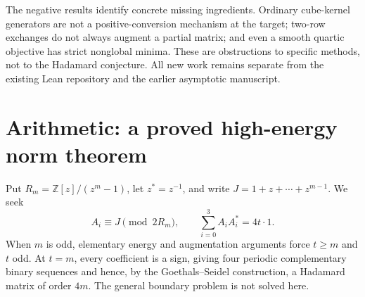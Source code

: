 \documentclass[11pt]{article}
\newcommand{\Z}{\mathbb Z}
\begin{document}
The negative results identify concrete missing ingredients. Ordinary
cube-kernel generators are not a positive-conversion mechanism at the
target; two-row exchanges do not always augment a partial matrix; and
even a smooth quartic objective has strict nonglobal minima. These are
obstructions to specific methods, not to the Hadamard conjecture.
All new work remains separate from the existing Lean repository and
the earlier asymptotic manuscript.

\section{Arithmetic: a proved high-energy norm theorem}


Put $R_m=\Z[z]/(z^m-1)$, let $z^*=z^{-1}$, and write
$J=1+z+\cdots+z^{m-1}$. We seek
\begin{equation}\label{eq:target}
 A_i\equiv J\pmod{2R_m},\qquad
 \sum_{i=0}^3A_iA_i^*=4t\cdot1.
\end{equation}
When $m$ is odd, elementary energy and augmentation arguments force
$t\ge m$ and $t$ odd. At $t=m$, every coefficient is a sign, giving
four periodic complementary binary sequences and hence, by the
Goethals--Seidel construction, a Hadamard matrix of order $4m$.
The general boundary problem is not solved here.
\end{document}
